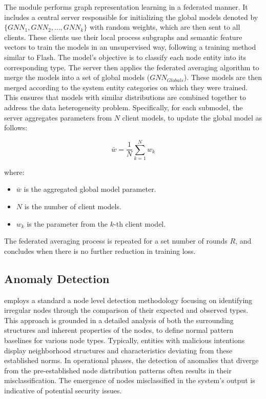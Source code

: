 The module performs graph representation learning in a federated manner. It includes a central server responsible for initializing the global \gnnshort models denoted by \(\{GNN_1, GNN_2, \ldots, GNN_k\} \) with random weights, which are then sent to all clients. These clients use their local process subgraphs and semantic feature vectors to train the \gnnshort models in an unsupervised way, following a training method similar to Flash. The \gnnshort model's objective is to classify each node entity into its corresponding type. The server then applies the federated averaging algorithm to merge the \gnnshort models into a set of global models (\( GNN_{Globals} \)). These models are then merged according to the system entity categories on which they were trained. This ensures that models with similar distributions are combined together to address the data heterogeneity problem. Specifically, for each submodel, the server aggregates parameters from \(N\) client models, to update the global model as follows:

\begin{equation}
\bar{w} = \frac{1}{N} \sum_{k=1}^{N}w_k
\end{equation}

where:
\begin{itemize}
    \item \(\bar{w}\) is the aggregated global model parameter.
    \item \(N\) is the number of client models.
    \item \(w_k\) is the parameter from the \(k\)-th client model.
\end{itemize}

The federated averaging process is repeated for a set number of rounds \(R\), and concludes when there is no further reduction in training loss.

\subsection{Anomaly Detection}
\label{sys:anomaly_detection}


\Sys employs a standard a node level detection methodology focusing on identifying irregular nodes through the comparison of their expected and observed types. This approach is grounded in a detailed analysis of both the surrounding structures and inherent properties of the nodes, to define normal pattern baselines for various node types. Typically, entities with malicious intentions display neighborhood structures and characteristics deviating from these established norms. In operational phases, the detection of anomalies that diverge from the pre-established node distribution patterns often results in their misclassification. The emergence of nodes misclassified in the system's output is indicative of potential security issues.

